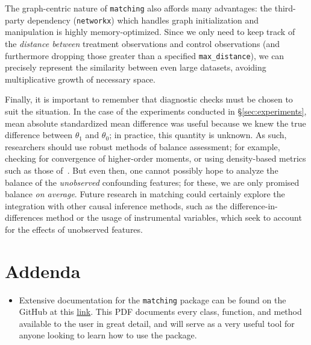 \documentclass[11pt]{extarticle}
\begin{document}
The graph-centric nature of \texttt{matching} also affords many advantages: the third-party dependency (\texttt{networkx}) which handles graph initialization and manipulation is highly memory-optimized.
Since we only need to keep track of the \emph{distance between} treatment observations and control observations (and furthermore dropping those greater than a specified \texttt{max\_distance}), we can precisely represent the similarity between even large datasets, avoiding multiplicative growth of necessary space.

Finally, it is important to remember that diagnostic checks must be chosen to suit the situation. In the case of the experiments conducted in \S\ref{sec:experiments}, mean absolute standardized mean difference was useful because we knew the true difference between $\theta_1$ and $\theta_0$; in practice, this quantity is unknown. As such, researchers should use robust methods of balance assessment; for example, checking for convergence of higher-order moments, or using density-based metrics such as those of~\textcite{zhu_kernel-based_2018}. But even then, one cannot possibly hope to analyze the balance of the \emph{unobserved} confounding features; for these, we are only promised balance \emph{on average}. Future research in matching could certainly explore the integration with other causal inference methods, such as the difference-in-differences method or the usage of instrumental variables, which seek to account for the effects of unobserved features.


\cleardoublepage
\section*{Addenda}

\begin{itemize}
  \item Extensive documentation for the \texttt{matching} package can be found on the GitHub at this \href{https://github.com/jackpotrykus/propensity-score-matching-thesis/blob/d47cd58ae7c6cd3fc8a5afc940212e2674d6e7ba/docs/matching.pdf}{link}. This PDF documents every class, function, and method available to the user in great detail, and will serve as a very useful tool for anyone looking to learn how to use the package.
\end{itemize}



\cleardoublepage
{}
{}
\printbibliography
\end{document}
